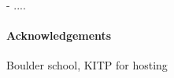 \documentclass[12pt,a4paper]{article}
\newcommand{\dave}[1]{{\color{ao(english)}\footnotesize{(DA) #1}}}
\newcommand{\ethan}[1]{{\color{amethyst}\footnotesize{(EL) #1}}}
\begin{document}
 - ....
 
 \paragraph{Acknowledgements}
 Boulder school, KITP for hosting
 
 

{}




\clearpage
\appendix






\end{document}
